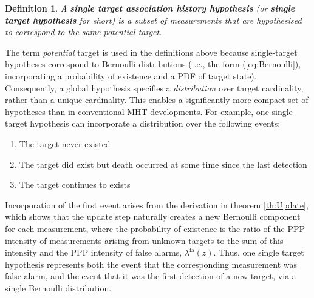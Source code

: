 \documentclass[journal,twoside]{IEEEtran}
\theoremstyle{plain}
\newtheorem{definition}{Definition}
\begin{document}
\begin{definition}\label{def:SingleTargetHypothesis}
A \textbf{single target association history hypothesis} (or \textbf{single target hypothesis} for short) is a subset of measurements that are hypothesised to correspond to the same potential target. 
\end{definition}
%
The term \emph{potential} target is used in the definitions above because single-target hypotheses correspond to Bernoulli distributions (i.e., the form (\ref{eq:Bernoulli}), incorporating a probability of existence and a PDF of target state). Consequently, a global hypothesis specifies a \emph{distribution} over target cardinality, rather than a unique cardinality. This enables a significantly more compact set of hypotheses than in conventional MHT developments. For example, one single target hypothesis can incorporate a distribution over the following events:
%
\begin{enumerate}
\item The target never existed
\item The target did exist but death occurred at some time since the last detection
\item The target continues to exists
\end{enumerate}
%
Incorporation of the first event arises from the derivation in theorem \ref{th:Update}, which shows that the update step naturally creates a new Bernoulli component for each measurement, where the probability of existence is the ratio of the PPP intensity of measurements arising from unknown targets to the sum of this intensity and the PPP intensity of false alarms, $\lambda^\mathrm{fa}(z)$. Thus, one single target hypothesis represents both the event that the corresponding measurement was false alarm, and the event that it was the first detection of a new target, via a single Bernoulli distribution.
\end{document}

